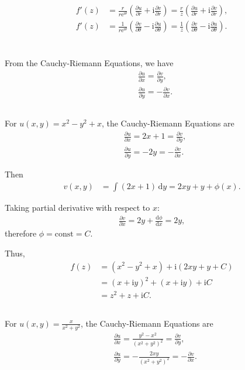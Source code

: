\documentclass[12pt]{article}
\begin{document}
\begin{align*}
f'(z) &= \frac{r}{r \mathrm{e}^{\mathrm{i}\theta}} \left( \frac{\partial u}{\partial r} + \mathrm{i} \frac{\partial v}{\partial r} \right) = \frac{r}{z} \left( \frac{\partial u}{\partial r} + \mathrm{i} \frac{\partial v}{\partial r} \right), \\
f'(z) &= \frac{1}{r \mathrm{e}^{\mathrm{i}\theta}} \left( \frac{\partial v}{\partial \theta} - \mathrm{i} \frac{\partial u}{\partial \theta} \right) = \frac{1}{z} \left( \frac{\partial v}{\partial \theta} - \mathrm{i} \frac{\partial u}{\partial \theta} \right).
\end{align*}
\section{}
From the Cauchy-Riemann Equations, we have
\begin{align*}
&\frac{\partial u}{\partial x} = \frac{\partial v}{\partial y}, \\
&\frac{\partial u}{\partial y} = -\frac{\partial v}{\partial x}.
\end{align*}
\subsection{}
For \( u(x,y) = x^2 - y^2 + x \), the Cauchy-Riemann Equations are
\begin{align*}
&\frac{\partial u}{\partial x} = 2x + 1 = \frac{\partial v}{\partial y}, \\
&\frac{\partial u}{\partial y} = -2y = -\frac{\partial v}{\partial x}.
\end{align*}

Then
\begin{align*}
v(x,y) &= \int (2x + 1) \, \mathrm{d}y = 2xy + y + \phi(x).
\end{align*}

Taking partial derivative with respect to \( x \):
\begin{align*}
\frac{\partial v}{\partial x} = 2y + \frac{\mathrm{d}\phi}{\mathrm{d}x} = 2y,
\end{align*}
therefore \( \phi = \text{const} = C \).

Thus,
\begin{align*}
f(z) &= (x^2 - y^2 + x) + \mathrm{i}(2xy + y + C) \\
&= (x + \mathrm{i}y)^2 + (x + \mathrm{i}y) + \mathrm{i}C \\
&= z^2 + z + \mathrm{i}C.
\end{align*}
\subsection{}
For \( u(x,y) = \frac{x}{x^2 + y^2} \), the Cauchy-Riemann Equations are
\begin{align*}
&\frac{\partial u}{\partial x} = \frac{y^2 - x^2}{(x^2 + y^2)^2} = \frac{\partial v}{\partial y}, \\
&\frac{\partial u}{\partial y} = -\frac{2xy}{(x^2 + y^2)^2} = -\frac{\partial v}{\partial x}.
\end{align*}
\end{document}
